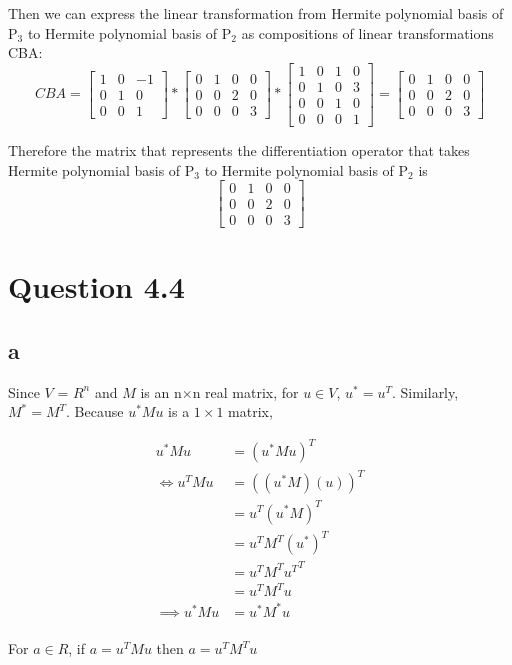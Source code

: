 \documentclass[11pt]{amsart}
\begin{document}
Then we can express the linear transformation from Hermite polynomial basis of P$_{3}$ to Hermite polynomial basis of  P$_{2}$ as compositions of linear transformations CBA:
\[
CBA = 
\begin{bmatrix}
1 & 0 & -1 \\
0 & 1 & 0 \\
0 & 0 & 1
\end{bmatrix} * 
\begin{bmatrix}
0 & 1 & 0& 0 \\
0 & 0 & 2 & 0 \\
0 & 0 & 0 & 3 
\end{bmatrix}*
\begin{bmatrix}
1 & 0 & 1& 0 \\
0 & 1 & 0 & 3 \\
0 & 0 & 1 & 0 \\
0 & 0 & 0 & 1
\end{bmatrix} =
\begin{bmatrix}
0 & 1 & 0& 0 \\
0 & 0 & 2 & 0 \\
0 & 0 & 0 & 3 
\end{bmatrix}
\]

Therefore the matrix that represents the differentiation operator that takes Hermite polynomial basis of P$_{3}$ to Hermite polynomial basis of P$_{2}$ is 
\[
\begin{bmatrix}
0 & 1 & 0& 0 \\
0 & 0 & 2 & 0 \\
0 & 0 & 0 & 3 
\end{bmatrix}
\]

\section*{Question 4.4}
\subsection*{a}
Since $V$ = $R^n$ and $M$ is an n$\times$n real matrix, for $u \in V$, $u^* = u^T$. Similarly, $M^* = M^T$. Because $u^*Mu$ is a $1\times1$ matrix,

\begin{align*}
u^*Mu &= (u^*Mu)^T\\
\iff u^TMu &= ((u^*M)(u))^T\\ &= u^T(u^*M)^T\\ &= u^TM^T(u^*)^T\\ &=u^TM^T{u^T}^T\\ &=u^TM^Tu\\
\implies u^*Mu &= u^*M^*u
\end{align*}
\\For $a \in R$, if $a= u^TMu$ then $a = u^TM^Tu$
\end{document}
